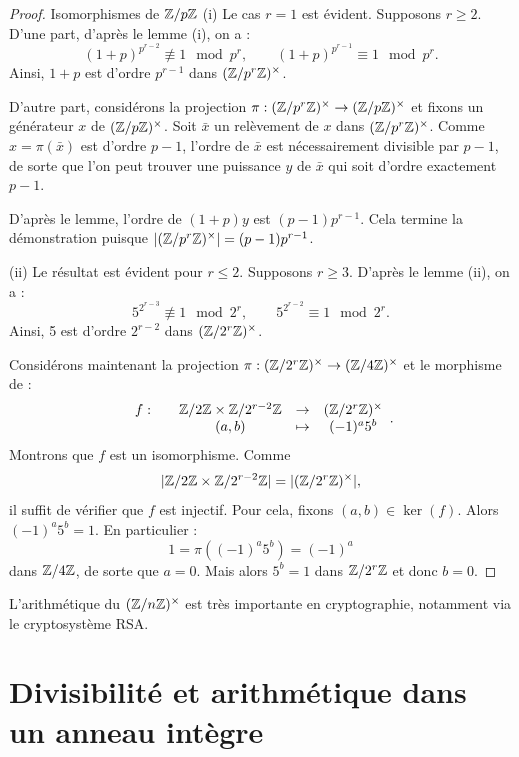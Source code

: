 \documentclass[]{report}
\begin{document}
\begin{proof}{Isomorphismes de $\mathbb{Z}/p\mathbb{Z}$}{}
    (i) Le cas $r = 1$ est évident. Supposons $r \ge 2$. D'une part, d'après le lemme (i), on a :
    \[(1 + p)^{p^{r-2}} \not\equiv 1 \mod p^r, \qquad (1 + p)^{p^{r-1}} \equiv 1 \mod p^r.\]
    Ainsi, $1 + p$ est d'ordre $p^{r-1}$ dans $(\mathbb{Z}/p^r\mathbb{Z})^{\times}$.

    D'autre part, considérons la projection $\pi : (\mathbb{Z}/p^r\mathbb{Z})^{\times} \to (\mathbb{Z}/p\mathbb{Z})^{\times}$ et fixons un générateur $x$ de $(\mathbb{Z}/p\mathbb{Z})^{\times}$. Soit $\bar{x}$ un relèvement de $x$ dans $(\mathbb{Z}/p^r\mathbb{Z})^{\times}$. Comme $x = \pi(\bar{x})$ est d'ordre $p - 1$, l'ordre de $\bar{x}$ est nécessairement divisible par $p - 1$, de sorte que l'on peut trouver une puissance $y$ de $\bar{x}$ qui soit d'ordre exactement $p - 1$.

    D'après le lemme, l'ordre de $(1 + p)y$ est $(p - 1)p^{r-1}$. Cela termine la démonstration puisque $|(\mathbb{Z}/p^r\mathbb{Z})^{\times}| = (p - 1)p^{r-1}$.

    (ii) Le résultat est évident pour $r \le 2$. Supposons $r \ge 3$. D'après le lemme (ii), on a :
    \[5^{2^{r-3}} \not\equiv 1 \mod 2^r, \qquad 5^{2^{r-2}} \equiv 1 \mod 2^r.\]
    Ainsi, 5 est d'ordre $2^{r-2}$ dans $(\mathbb{Z}/2^r\mathbb{Z})^{\times}$.

    Considérons maintenant la projection $\pi : (\mathbb{Z}/2^r\mathbb{Z})^{\times} \to (\mathbb{Z}/4\mathbb{Z})^{\times}$ et le morphisme de \grs :
    \[\begin{array}{ccccc} f : & & \mathbb{Z}/2\mathbb{Z} \times \mathbb{Z}/2^{r-2}\mathbb{Z} & \to & (\mathbb{Z}/2^r\mathbb{Z})^{\times} \\ & & (a, b) & \mapsto & (-1)^a 5^b \end{array}.\]
    Montrons que $f$ est un isomorphisme. Comme
    \[|\mathbb{Z}/2\mathbb{Z} \times \mathbb{Z}/2^{r-2}\mathbb{Z}| = |(\mathbb{Z}/2^r\mathbb{Z})^{\times}|,\]
    il suffit de vérifier que $f$ est injectif. Pour cela, fixons $(a, b) \in \ker(f)$. Alors $(-1)^a 5^b = 1$. En particulier :
    \[1 = \pi((-1)^a 5^b) = (-1)^a\]
    dans $\mathbb{Z}/4\mathbb{Z}$, de sorte que $a = 0$. Mais alors $5^b = 1$ dans $\mathbb{Z}/2^r\mathbb{Z}$ et donc $b = 0$.
\end{proof}

L'arithmétique du \gr $(\mathbb{Z}/n\mathbb{Z})^{\times}$ est très importante en cryptographie, notamment via le cryptosystème RSA.

\section{Divisibilité et arithmétique dans un anneau intègre}
\end{document}
